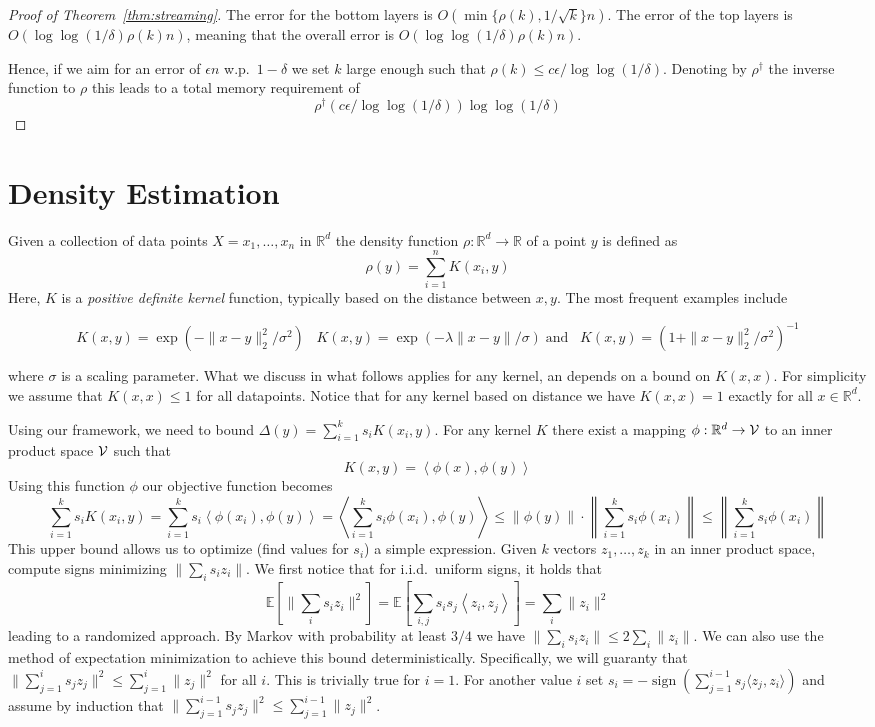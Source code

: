 \documentclass{article} %
\newcommand{\ip}[1]{\left \langle #1 \right \rangle}
\newcommand{\R}{\mathbb{R}}
\newcommand{\E}{\mathbb{E}}
\newcommand{\eps}{\epsilon}
\begin{document}
\begin{proof} [Proof of Theorem~\ref{thm:streaming}]
The error for the bottom layers is $O(\min\{\rho(k), 1/\sqrt{k}\} n)$. The error of the top layers is $O(\log\log(1/\delta) \rho(k) n)$, meaning that the overall error is $O(\log\log(1/\delta) \rho(k) n)$.

Hence, if we aim for an error of $\eps n$ w.p.\ $1-\delta$ we set $k$ large enough such that $\rho(k) \leq c \eps / \log\log(1/\delta)$. Denoting by $\rho^{\dagger}$ the inverse function to $\rho$ this leads to a total memory requirement of 
$$ \rho^{\dagger}(c \eps / \log\log(1/\delta)) \log\log(1/\delta) $$

\end{proof}


\section{Density Estimation}

Given a collection of data points $X = x_1,\ldots, x_n$ in $\R^d$ the density function $\rho: \R^d \rightarrow \R$ of a point $y$ is defined as 
$$ \rho(y) = \sum_{i=1}^{n} K(x_i,y) $$
Here, $K$ is a \emph{positive definite kernel} function, typically based on the distance between $x,y$. The most frequent examples include

$$ K(x,y) = \exp(- \|x-y\|_2^2/\sigma^2)\;\;\; K(x,y) = \exp(-\lambda \|x-y\|/\sigma) \; \mbox{and}\;\;\; K(x,y) = (1+\|x-y\|_2^2/\sigma^2)^{-1}$$

where $\sigma$ is a scaling parameter. What we discuss in what follows applies for any kernel, an depends on a bound on $K(x,x)$. For simplicity we assume that $K(x,x) \leq 1$ for all datapoints. Notice that for any kernel based on distance we have $K(x,x)=1$ exactly for all $x \in \R^d$.


Using our framework, we need to bound $\Delta(y) = \sum_{i=1}^k s_i K(x_i,y)$. For any kernel $K$ there exist a mapping $\phi: \R^d \to {\cal V}$ to an inner product space $\cal V$ such that 
$$ K(x,y) = \ip{\phi(x), \phi(y)} $$
Using this function $\phi$ our objective function becomes
$$\sum_{i=1}^k s_i K(x_i,y) = \sum_{i=1}^k s_i \ip{\phi(x_i), \phi(y)} =  \ip{ \sum_{i=1}^k s_i \phi(x_i), \phi(y)} \leq \|\phi(y)\| \cdot \left\|  \sum_{i=1}^k s_i \phi(x_i) \right\| \leq  \left\|  \sum_{i=1}^k s_i \phi(x_i) \right\| $$
This upper bound allows us to optimize (find values for $s_i$) a simple expression.
Given $k$ vectors $z_1,\ldots,z_k$ in an inner product space, compute signs minimizing $\| \sum_i s_i z_i \|$.
We first notice that for i.i.d.\ uniform signs, it holds that
$$\E[\| \sum_i s_i z_i \|^2] = \E[\sum_{i,j} s_i s_j \ip{z_i, z_j}] = \sum_i \|z_i\|^2 $$
leading to a randomized approach. By Markov with probability at least $3/4$ we have $\| \sum_i s_i z_i \| \le 2\sum_i \|z_i\|$.
%
We can also use the method of expectation minimization to achieve this bound deterministically.
Specifically, we will guaranty that $\| \sum_{j=1}^i s_j z_j \|^2 \le \sum_{j=1}^i \|z_j\|^2$ for all $i$.
This is trivially true for $i=1$. 
For another value $i$ set $s_i = -\operatorname{sign} (\sum_{j=1}^{i-1}s_j \langle z_j, z_i \rangle)$ 
and  assume by induction that $\| \sum_{j=1}^{i-1} s_j z_j\|^2 \le \sum_{j=1}^{i-1} \|z_j\|^2$.
\end{document}
